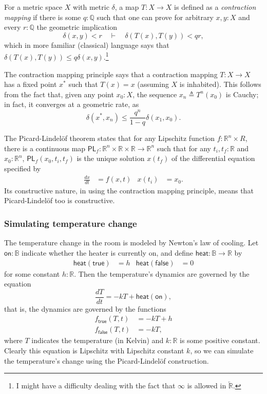 \documentclass{article}           %
\newcommand{\R}{\mathbb{R}}
\newcommand{\rat}{\mathbb{Q}}
\newcommand{\bool}{\mathbb{B}}
\newcommand{\upperT}[1]{\overleftarrow{#1}}
\newcommand{\defeq}{\triangleq}
\begin{document}
For a metric space $X$ with metric $\delta$, a map $T : X \to X$ is defined as a \emph{contraction mapping} if there is some $q : \rat$ such that one can prove for arbitrary $x, y : X$ and every $r : \rat$ the geometric implication
\[
\delta(x, y) < r
\quad \vdash \quad
\delta(T(x), T(y)) < q r,
\]
which in more familiar (classical) language says that $\delta(T(x), T(y)) \le q \delta(x, y)$.\footnote{I might have a difficulty dealing with the fact that $\infty$ is allowed in $\upperT{\R}$.}

The contraction mapping principle says that a contraction mapping $T : X \to X$ has a fixed point $x^*$ such that $T(x) = x$ (assuming $X$ is inhabited). This follows from the fact that, given any point $x_0 : X$, the sequence $x_n \defeq T^n(x_0)$ is Cauchy; in fact, it converges at a geometric rate, as
\[
\delta(x^*, x_n) \le \frac{q^n}{1 - q} \delta(x_1, x_0).
\]

The Picard-Lindelöf theorem states that for any Lipschitz function $f : \R^n \times R$, there is a continuous map $\mathsf{PL}_f : \R^n \times \R \times \R \to \R^n$ such that for any $t_i, t_f : \R$ and $x_0 : \R^n$, $\mathsf{PL}_f(x_0, t_i, t_f)$ is the unique solution $x(t_f)$ of the differential equation specified by
\begin{align*}
\frac{dx}{dt} &= f(x, t)
&
x(t_i) &= x_0.
\end{align*}
Its constructive nature, in using the contraction mapping principle, means that Picard-Lindelöf too is constructive.

\subsubsection{Simulating temperature change}

The temperature change in the room is modeled by Newton's law of cooling. Let $\mathsf{on} : \bool$ indicate whether the heater is currently on, and define $\mathsf{heat} : \bool \to \R$ by
\begin{align*}
\mathsf{heat}(\mathsf{true}) &= h
&
\mathsf{heat}(\mathsf{false}) &= 0
\end{align*}
for some constant $h : \R$. Then the temperature's dynamics are governed by the equation
\[
\frac{dT}{dt} = -kT + \mathsf{heat}(\mathsf{on}),
\]
that is, the dynamics are governed by the functions
\begin{align*}
f_\mathsf{true}(T, t) &= -kT + h
\\ f_\mathsf{false}(T, t) &= -kT,
\end{align*}
where $T$ indicates the temperature (in Kelvin) and $k : \R$ is some positive constant. Clearly this equation is Lipschitz with Lipschitz constant $k$, so we can simulate the temperature's change using the Picard-Lindelöf construction.
\end{document}
